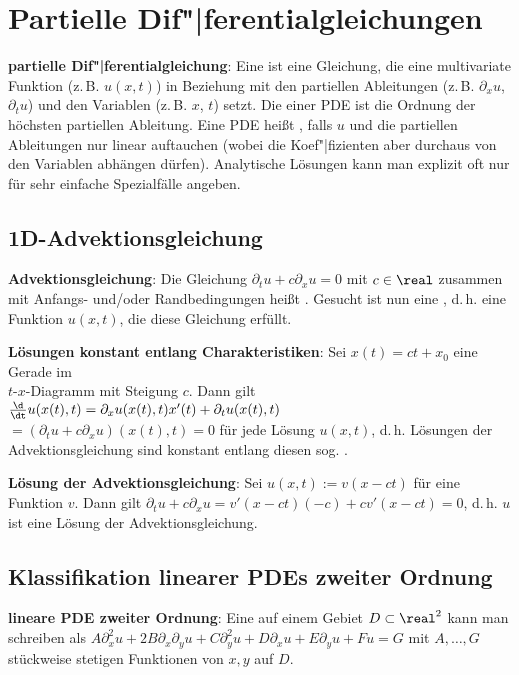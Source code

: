 \chapter{%
    Partielle Dif"|ferentialgleichungen%
}

\textbf{partielle Dif"|ferentialgleichung}:
Eine  ist eine Gleichung,
die eine multivariate Funktion (z.\,B. $u(x, t)$) in Beziehung mit den partiellen Ableitungen
(z.\,B. $\partial_x u$, $\partial_t u$) und den Variablen (z.\,B. $x$, $t$) setzt.
Die  einer PDE ist die Ordnung der höchsten partiellen Ableitung.
Eine PDE heißt , falls $u$ und die partiellen Ableitungen nur linear auftauchen
(wobei die Koef"|fizienten aber durchaus von den Variablen abhängen dürfen).
Analytische Lösungen kann man explizit oft nur für sehr einfache Spezialfälle angeben.

\section{%
    1D-Advektionsgleichung%
}

\textbf{Advektionsgleichung}:
Die Gleichung $\partial_t u + c \partial_x u = 0$ mit $c \in \real$ zusammen mit
Anfangs- und/oder Randbedingungen heißt .
Gesucht ist nun eine , d.\,h. eine Funktion $u(x, t)$,
die diese Gleichung erfüllt.

\textbf{Lösungen konstant entlang Charakteristiken}:
Sei $x(t) = ct + x_0$ eine Gerade im\\
$t$-$x$-Diagramm mit Steigung $c$.
Dann gilt $\frac{\d}{\dt} u(x(t), t) = \partial_x u(x(t), t) x'(t) + \partial_t u(x(t), t)$\\
$= (\partial_t u + c \partial_x u)(x(t), t) = 0$ für jede Lösung $u(x, t)$,
d.\,h. Lösungen der Advektionsgleichung sind konstant entlang diesen sog.
.

\textbf{Lösung der Advektionsgleichung}:
Sei $u(x, t) := v(x - ct)$ für eine Funktion $v$.
Dann gilt $\partial_t u + c \partial_x u = v'(x - ct) (-c) + c v'(x - ct) = 0$,
d.\,h. $u$ ist eine Lösung der Advektionsgleichung.

\section{%
    Klassifikation linearer PDEs zweiter Ordnung%
}

\textbf{lineare PDE zweiter Ordnung}:
Eine  auf einem Gebiet $D \subset \real^2$ kann man schreiben
als $A \partial_x^2 u + 2B \partial_x \partial_y u + C \partial_y^2 u +
D \partial_x u + E \partial_y u + Fu = G$ mit $A, \dotsc, G$ stückweise stetigen Funktionen
von $x, y$ auf $D$.

